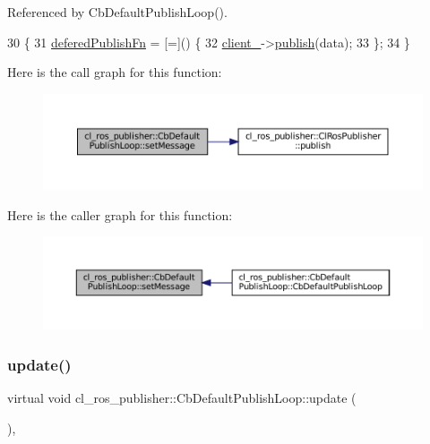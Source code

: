 Referenced by Cb\+Default\+Publish\+Loop().


\begin{DoxyCode}
30     \{
31         \hyperlink{classcl__ros__publisher_1_1CbDefaultPublishLoop_ac0044704637edbd8f79a69d5b06de9ba}{deferedPublishFn} = [=]() \{
32             \hyperlink{classcl__ros__publisher_1_1CbDefaultPublishLoop_a483b8c34b88dadc718fbf4bf1f95acb5}{client\_}->\hyperlink{classcl__ros__publisher_1_1ClRosPublisher_a3517d62fb0703a0a72efe6de7ad1a6d8}{publish}(data);
33         \};
34     \}
\end{DoxyCode}
Here is the call graph for this function\+:
\nopagebreak
\begin{figure}[H]
\begin{center}
\leavevmode
\includegraphics[width=350pt]{classcl__ros__publisher_1_1CbDefaultPublishLoop_a0377d84fde4cd1193abe5daf172359a7_cgraph}
\end{center}
\end{figure}
Here is the caller graph for this function\+:
\nopagebreak
\begin{figure}[H]
\begin{center}
\leavevmode
\includegraphics[width=350pt]{classcl__ros__publisher_1_1CbDefaultPublishLoop_a0377d84fde4cd1193abe5daf172359a7_icgraph}
\end{center}
\end{figure}
\mbox{\label{classcl__ros__publisher_1_1CbDefaultPublishLoop_aef241d1976f0105643976545880d5e21}} 
\subsubsection{\texorpdfstring{update()}{update()}}
{\footnotesize\ttfamily virtual void cl\+\_\+ros\+\_\+publisher\+::\+Cb\+Default\+Publish\+Loop\+::update (\begin{DoxyParamCaption}{ }\end{DoxyParamCaption})\hspace{0.3cm}{\ttfamily [inline]}, {\ttfamily [virtual]}}



